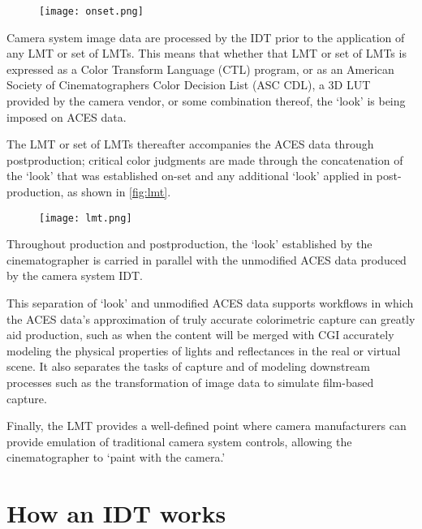 \begin{figure}[htbp]
\begin{center}
    \texttt{[image: onset.png]}
\caption{}
\label{fig:onset}
\end{center}
\end{figure}

Camera system image data are processed by the IDT prior to the application of any LMT or set of LMTs. This means that whether that LMT or set of LMTs is expressed as a Color Transform Language (CTL) program, or as an American Society of Cinematographers Color Decision List (ASC CDL), a 3D LUT provided by the camera vendor, or some combination thereof, the `look' is being imposed on ACES data.

The LMT or set of LMTs thereafter accompanies the ACES data through postproduction; critical color judgments are made through the concatenation of the `look' that was established on-set and any additional `look' applied in post-production, as shown in \autoref{fig:lmt}.

\begin{figure}[htbp]
\begin{center}
    \texttt{[image: lmt.png]}
\caption{}
\label{fig:lmt}
\end{center}
\end{figure}

Throughout production and postproduction, the `look' established by the cinematographer is carried in parallel with the unmodified ACES data produced by the camera system IDT.

This separation of `look' and unmodified ACES data supports workflows in which the ACES data's approximation of truly accurate colorimetric capture can greatly aid production, such as when the content will be merged with CGI accurately modeling the physical properties of lights and reflectances in the real or virtual scene. It also separates the tasks of capture and of modeling downstream processes such as the transformation of image data to simulate film-based capture.

Finally, the LMT provides a well-defined point where camera manufacturers can provide emulation of traditional camera system controls, allowing the cinematographer to `paint with the camera.'

\section{How an IDT works}
